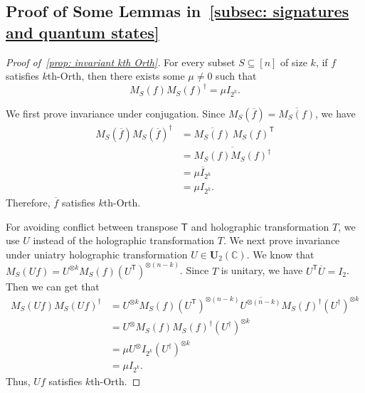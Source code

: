 










\subsection{Proof of Some Lemmas in~\cref{subsec: signatures and quantum states}}\label{subapp: proof of subsec signatures and quantum states}

\begin{proof}[Proof of~\cref{prop: invariant kth Orth}]
    For every subset $S\subseteq [n]$ of size $k$, if $f$ satisfies {\sc $k$th-Orth}, then there exists some $\mu\neq 0$ such that 
    \begin{equation}
        M_S(f)M_S(f)^\dagger=\mu I_{2^k}.
    \end{equation}

    We first prove invariance under conjugation. Since $M_S(\overline f)=\overline{M_S(f)}$, we have 
    \begin{equation}
        \begin{aligned}
            M_S(\overline f)M_S(\overline f)^\dagger
            &=\overline{M_S(f)}\,M_S(f)^{\mathsf T}\\
            &=\overline{M_S(f)M_S(f)^\dagger}\\
            &=\overline{\mu I_{2^k}}\\
            &=\mu I_{2^k}.
        \end{aligned}
    \end{equation}
   Therefore, $\overline{f}$ satisfies {\sc $k$th-Orth}. 

   For avoiding conflict between transpose $\mathsf{T}$ and holographic transformation $T$, we use $U$ instead of the holographic transformation $T$.
   We next prove invariance under uniatry holographic transformation $U\in \mathbf{U}_2(\mathbb{C})$. We know that $M_S(Uf)=U^{\otimes k}M_S(f)(U^{\mathsf{T}})^{\otimes(n-k)}$. Since $T$ is unitary, we have $U^{\mathsf{T}}\overline U=I_2$. Then we can get that 
   \begin{equation}
    \begin{aligned}
        M_S(Uf)M_S(Uf)^\dagger
        &= U^{\otimes k}M_S(f) (U^{\mathsf{T}})^{\otimes (n-k)}\overline{U^{\otimes (n-k)}}M_S(f)^\dagger (U^\dagger)^{\otimes k}\\
        &=U^{\otimes}M_S(f)M_S(f)^\dagger (U^\dagger)^{\otimes k}\\
        &=\mu U^{\otimes}I_{2^k} (U^\dagger)^{\otimes k}\\
        &=\mu I_{2^k}.
    \end{aligned}
   \end{equation}
   Thus, $Uf$ satisfies {\sc $k$th-Orth}.
\end{proof}
